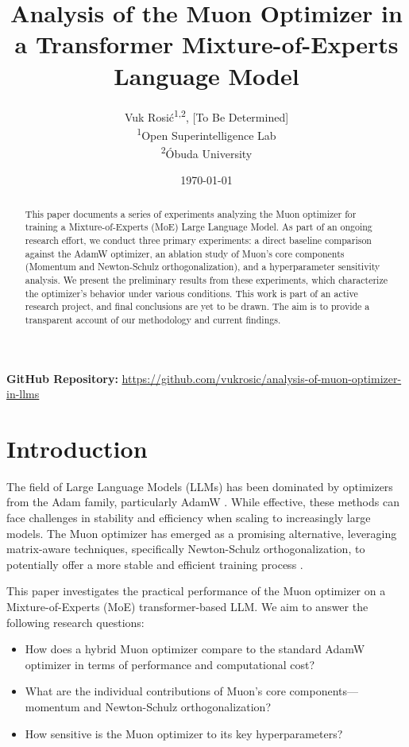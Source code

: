 \documentclass[11pt, a4paper]{article}
\title{\textbf{Analysis of the Muon Optimizer in a Transformer Mixture-of-Experts Language Model}}
\author{
    Vuk Rosić\textsuperscript{1,2}, [To Be Determined] \\
    \textsuperscript{1}Open Superintelligence Lab \\
    \textsuperscript{2}Óbuda University
}
\date{\today}
\begin{document}
\maketitle

\begin{abstract}
This paper documents a series of experiments analyzing the Muon optimizer for training a Mixture-of-Experts (MoE) Large Language Model. As part of an ongoing research effort, we conduct three primary experiments: a direct baseline comparison against the AdamW optimizer, an ablation study of Muon's core components (Momentum and Newton-Schulz orthogonalization), and a hyperparameter sensitivity analysis. We present the preliminary results from these experiments, which characterize the optimizer's behavior under various conditions. This work is part of an active research project, and final conclusions are yet to be drawn. The aim is to provide a transparent account of our methodology and current findings.
\end{abstract}

\vspace{1em}
\noindent\textbf{GitHub Repository:} \url{https://github.com/vukrosic/analysis-of-muon-optimizer-in-llms}

\section{Introduction}
The field of Large Language Models (LLMs) has been dominated by optimizers from the Adam family, particularly AdamW \cite{loshchilov2017decoupled, kingma2014adam}. While effective, these methods can face challenges in stability and efficiency when scaling to increasingly large models. The Muon optimizer has emerged as a promising alternative, leveraging matrix-aware techniques, specifically Newton-Schulz orthogonalization, to potentially offer a more stable and efficient training process \cite{bernstein2020metricizing, liu2025muon, jordan2024muon}.

This paper investigates the practical performance of the Muon optimizer on a Mixture-of-Experts (MoE) transformer-based LLM. We aim to answer the following research questions:
\begin{itemize}
    \item How does a hybrid Muon optimizer compare to the standard AdamW optimizer in terms of performance and computational cost?
    \item What are the individual contributions of Muon's core components—momentum and Newton-Schulz orthogonalization?
    \item How sensitive is the Muon optimizer to its key hyperparameters?
\end{itemize}
\end{document}
